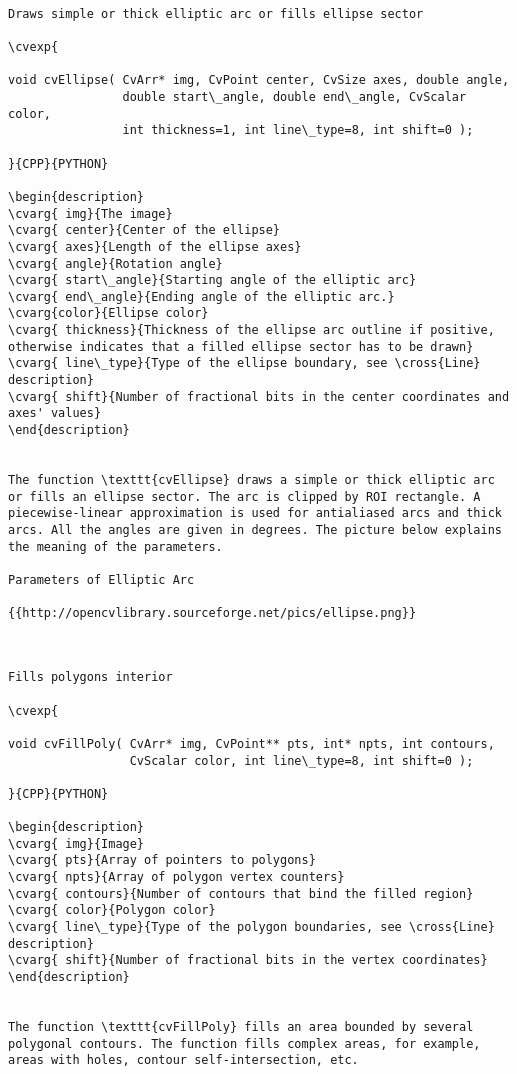 \label{Ellipse}
\begin{verbatim}

Draws simple or thick elliptic arc or fills ellipse sector

\cvexp{

void cvEllipse( CvArr* img, CvPoint center, CvSize axes, double angle,
                double start\_angle, double end\_angle, CvScalar color,
                int thickness=1, int line\_type=8, int shift=0 );

}{CPP}{PYTHON}

\begin{description}
\cvarg{ img}{The image}
\cvarg{ center}{Center of the ellipse}
\cvarg{ axes}{Length of the ellipse axes}
\cvarg{ angle}{Rotation angle}
\cvarg{ start\_angle}{Starting angle of the elliptic arc}
\cvarg{ end\_angle}{Ending angle of the elliptic arc.}
\cvarg{color}{Ellipse color}
\cvarg{ thickness}{Thickness of the ellipse arc outline if positive, otherwise indicates that a filled ellipse sector has to be drawn}
\cvarg{ line\_type}{Type of the ellipse boundary, see \cross{Line} description}
\cvarg{ shift}{Number of fractional bits in the center coordinates and axes' values}
\end{description}


The function \texttt{cvEllipse} draws a simple or thick elliptic arc or fills an ellipse sector. The arc is clipped by ROI rectangle. A piecewise-linear approximation is used for antialiased arcs and thick arcs. All the angles are given in degrees. The picture below explains the meaning of the parameters.

Parameters of Elliptic Arc

{{http://opencvlibrary.sourceforge.net/pics/ellipse.png}}


\end{verbatim}
\label{FillPoly}
\begin{verbatim}

Fills polygons interior

\cvexp{

void cvFillPoly( CvArr* img, CvPoint** pts, int* npts, int contours,
                 CvScalar color, int line\_type=8, int shift=0 );

}{CPP}{PYTHON}

\begin{description}
\cvarg{ img}{Image}
\cvarg{ pts}{Array of pointers to polygons}
\cvarg{ npts}{Array of polygon vertex counters}
\cvarg{ contours}{Number of contours that bind the filled region}
\cvarg{ color}{Polygon color}
\cvarg{ line\_type}{Type of the polygon boundaries, see \cross{Line} description}
\cvarg{ shift}{Number of fractional bits in the vertex coordinates}
\end{description}


The function \texttt{cvFillPoly} fills an area bounded by several polygonal contours. The function fills complex areas, for example, areas with holes, contour self-intersection, etc.


\end{verbatim}
